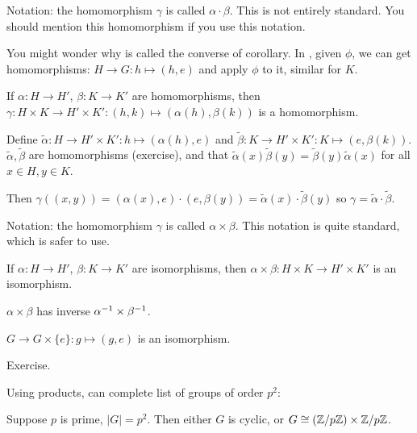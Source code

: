 Notation: the homomorphism $\gamma$ is called $\alpha\cdot \beta$. This is not entirely standard. You should mention this homomorphism if you use this notation.


\begin{remark}
	You might wonder why  is called the converse of corollary. In , given $\phi$, we can get homomorphisms: $H\to G: h\mapsto (h,e)$ and apply $\phi$ to it, similar for $K$.
\end{remark}

\begin{corr}
If $\alpha: H\to H'$, $\beta: K\to K'$ are homomorphisms, then $\gamma: H\times K\to H'\times K': (h,k)\mapsto (\alpha(h),\beta(k))$ is a homomorphism.
\end{corr}

\begin{pf}
Define $\tilde{\alpha}: H\to H'\times K': h \mapsto (\alpha(h),e)$ and $\tilde{\beta}: K\to H'\times K': K\mapsto (e,\beta(k))$. $\tilde{\alpha},\tilde{\beta}$ are homomorphisms (exercise), and that $\tilde{\alpha}(x)\tilde{\beta}(y)=\tilde{\beta}(y)\tilde{\alpha}(x)$ for all $x\in H,y\in K$.

Then $\gamma((x,y))= (\alpha(x),e)\cdot (e,\beta(y))=\tilde{\alpha}(x)\cdot \tilde{\beta}(y)$ so $\gamma = \tilde{\alpha}\cdot \tilde{\beta}$.
\end{pf}

Notation: the homomorphism $\gamma$ is called $\alpha\times \beta$. This notation is quite standard, which is safer to use.

\begin{corr}
If $\alpha:H\to H'$, $\beta: K\to K'$ are isomorphisms, then $\alpha\times \beta: H\times K\to H'\times K'$ is an isomorphism.
\end{corr}

\begin{pf}
$\alpha\times\beta$ has inverse $\alpha^{-1}\times\beta^{-1}$.
\end{pf}

\begin{prop}
$G\to G\times \{e\}: g\mapsto (g,e)$ is an isomorphism.
\end{prop}

\begin{pf}
Exercise.
\end{pf}

Using products, can complete list of groups of order $p^2$:
\begin{prop}
Suppose $p$ is prime, $|G|=p^2$. Then either $G$ is cyclic, or $G\cong (\mathbb Z/{p}\mathbb Z)\times \mathbb Z/{p}\mathbb Z$.
\end{prop}

